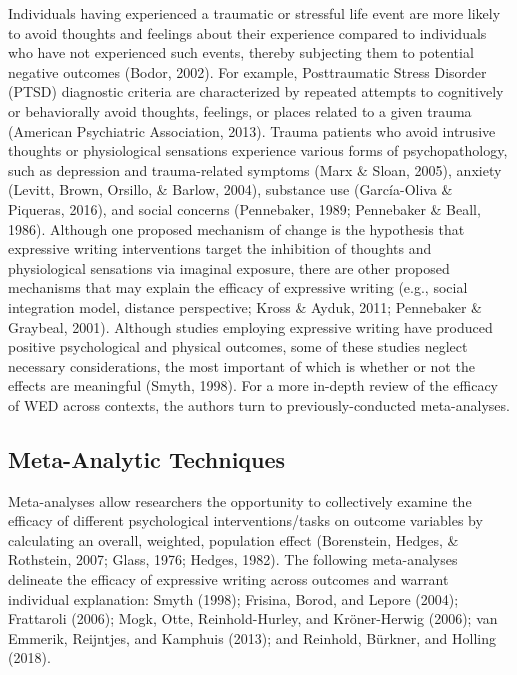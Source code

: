 \documentclass[,man]{apa6}
\begin{document}
Individuals having experienced a traumatic or stressful life event are more likely to avoid thoughts and feelings about their experience compared to individuals who have not experienced such events, thereby subjecting them to potential negative outcomes (Bodor, 2002). For example, Posttraumatic Stress Disorder (PTSD) diagnostic criteria are characterized by repeated attempts to cognitively or behaviorally avoid thoughts, feelings, or places related to a given trauma (American Psychiatric Association, 2013). Trauma patients who avoid intrusive thoughts or physiological sensations experience various forms of psychopathology, such as depression and trauma-related symptoms (Marx \& Sloan, 2005), anxiety (Levitt, Brown, Orsillo, \& Barlow, 2004), substance use (García-Oliva \& Piqueras, 2016), and social concerns (Pennebaker, 1989; Pennebaker \& Beall, 1986). Although one proposed mechanism of change is the hypothesis that expressive writing interventions target the inhibition of thoughts and physiological sensations via imaginal exposure, there are other proposed mechanisms that may explain the efficacy of expressive writing (e.g., social integration model, distance perspective; Kross \& Ayduk, 2011; Pennebaker \& Graybeal, 2001). Although studies employing expressive writing have produced positive psychological and physical outcomes, some of these studies neglect necessary considerations, the most important of which is whether or not the effects are meaningful (Smyth, 1998). For a more in-depth review of the efficacy of WED across contexts, the authors turn to previously-conducted meta-analyses.

\hypertarget{meta-analytic-techniques}{%
\subsection{Meta-Analytic Techniques}\label{meta-analytic-techniques}}

Meta-analyses allow researchers the opportunity to collectively examine the efficacy of different psychological interventions/tasks on outcome variables by calculating an overall, weighted, population effect (Borenstein, Hedges, \& Rothstein, 2007; Glass, 1976; Hedges, 1982). The following meta-analyses delineate the efficacy of expressive writing across outcomes and warrant individual explanation: Smyth (1998); Frisina, Borod, and Lepore (2004); Frattaroli (2006); Mogk, Otte, Reinhold-Hurley, and Kröner-Herwig (2006); van Emmerik, Reijntjes, and Kamphuis (2013); and Reinhold, Bürkner, and Holling (2018).
\end{document}

